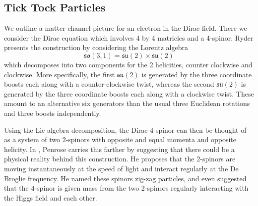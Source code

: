 \documentclass[12pt,a4paper]{article}
\begin{document}
\subsection{Tick Tock Particles}
We outline a matter channel picture for an electron in the Dirac field.  There we consider the Dirac equation which involves 4 by 4 matricies and a 4-spinor.  Ryder \cite{ryder} presents the construction by considering the Lorentz algebra
\[
\mathfrak{so(3,1)} = \mathfrak{su(2)} \times \mathfrak{su(2)}
\]
which decomposes into two components for the 2 helicities, counter clockwise and clockwise.  More specifically, the first $\mathfrak{su(2)}$ is generated by the three coordinate boosts each along with a counter-clockwise twist, whereas the second $\mathfrak{su(2)}$ is generated by the three coordinate boosts each along with a clockwise twist.  These amount to an alternative six generators than the usual three Euclidean rotations and three boosts independently.

Using the Lie algebra decomposition, the Dirac 4-spinor can then be thought of as a system of two 2-spinors with opposite and equal momenta and opposite helicity.  In \cite{penrose}, Penrose carries this farther by suggesting that there could be a physical reality behind this construction.  He proposes that the 2-spinors are moving instantaneously at the speed of light and interact regularly at the De Broglie frequency.  He named these spinors zig-zag particles, and even suggested that the 4-spinor is given mass from the two 2-spinors regularly interacting with the Higgs field and each other.
\end{document}
